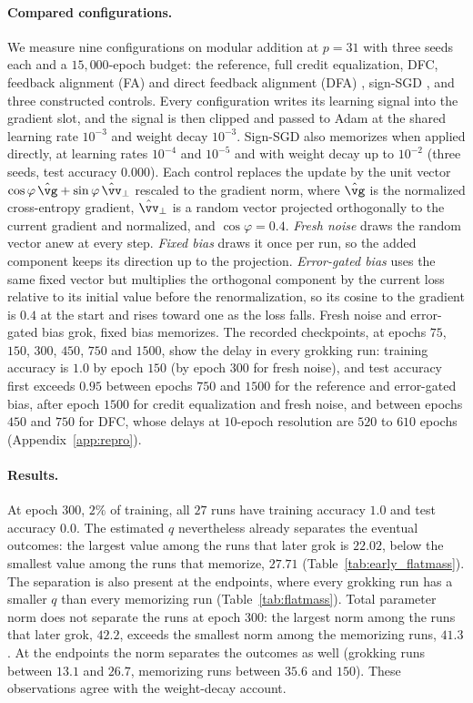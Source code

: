 \documentclass{article} %
\begin{document}
\paragraph{Compared configurations.} We measure nine configurations on modular addition at $p = 31$ with three seeds each and a $15{,}000$-epoch budget: the reference, full credit equalization, DFC, feedback alignment (FA) and direct feedback alignment (DFA) \citep{lillicrap2016feedback,nokland2016dfa}, sign-SGD \citep{bernstein2018signsgd}, and three constructed controls. Every configuration writes its learning signal into the gradient slot, and the signal is then clipped and passed to Adam at the shared learning rate $10^{-3}$ and weight decay $10^{-3}$. Sign-SGD also memorizes when applied directly, at learning rates $10^{-4}$ and $10^{-5}$ and with weight decay up to $10^{-2}$ (three seeds, test accuracy $0.000$). Each control replaces the update by the unit vector $\cos\varphi\,\hat{\vg} + \sin\varphi\,\hat{\vv}_\perp$ rescaled to the gradient norm, where $\hat{\vg}$ is the normalized cross-entropy gradient, $\hat{\vv}_\perp$ is a random vector projected orthogonally to the current gradient and normalized, and $\cos\varphi = 0.4$. \emph{Fresh noise} draws the random vector anew at every step. \emph{Fixed bias} draws it once per run, so the added component keeps its direction up to the projection. \emph{Error-gated bias} uses the same fixed vector but multiplies the orthogonal component by the current loss relative to its initial value before the renormalization, so its cosine to the gradient is $0.4$ at the start and rises toward one as the loss falls. Fresh noise and error-gated bias grok, fixed bias memorizes. The recorded checkpoints, at epochs $75$, $150$, $300$, $450$, $750$ and $1500$, show the delay in every grokking run: training accuracy is $1.0$ by epoch $150$ (by epoch $300$ for fresh noise), and test accuracy first exceeds $0.95$ between epochs $750$ and $1500$ for the reference and error-gated bias, after epoch $1500$ for credit equalization and fresh noise, and between epochs $450$ and $750$ for DFC, whose delays at $10$-epoch resolution are $520$ to $610$ epochs (Appendix~\ref{app:repro}).

\paragraph{Results.} At epoch $300$, $2\%$ of training, all $27$ runs have training accuracy $1.0$ and test accuracy $0.0$. The estimated $q$ nevertheless already separates the eventual outcomes: the largest value among the runs that later grok is $22.02$, below the smallest value among the runs that memorize, $27.71$ (Table~\ref{tab:early_flatmass}). The separation is also present at the endpoints, where every grokking run has a smaller $q$ than every memorizing run (Table~\ref{tab:flatmass}). Total parameter norm does not separate the runs at epoch $300$: the largest norm among the runs that later grok, $42.2$, exceeds the smallest norm among the memorizing runs, $41.3$. At the endpoints the norm separates the outcomes as well (grokking runs between $13.1$ and $26.7$, memorizing runs between $35.6$ and $150$). These observations agree with the weight-decay account.
\end{document}
